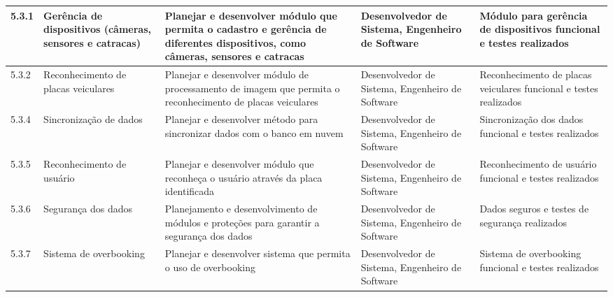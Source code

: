 \begin{longtable}{  l  p{}  p{}  p{}  p{}  }
	\midrule
	5.3.1       & Gerência de dispositivos (câmeras, sensores e catracas) & Planejar e desenvolver módulo que permita o cadastro e gerência de diferentes dispositivos, como câmeras, sensores e catracas                                                 & Desenvolvedor de Sistema, Engenheiro de Software                                                 & Módulo para gerência de dispositivos funcional e testes realizados                                     \\*
	\midrule
	5.3.2       & Reconhecimento de placas veiculares                       & Planejar e desenvolver módulo de processamento de imagem que permita o reconhecimento de placas veiculares                                                                      & Desenvolvedor de Sistema, Engenheiro de Software                                                 & Reconhecimento de placas veiculares funcional e testes realizados                                        \\*
	\midrule
	5.3.4       & Sincronização de dados                                  & Planejar e desenvolver método para sincronizar dados com o banco em nuvem                                                                                                       & Desenvolvedor de Sistema, Engenheiro de Software                                                 & Sincronização dos dados funcional e testes realizados                                                  \\*
	\midrule
	5.3.5       & Reconhecimento de usuário                                & Planejar e desenvolver módulo que reconheça o usuário através da placa identificada                                                                                          & Desenvolvedor de Sistema, Engenheiro de Software                                                 & Reconhecimento de usuário funcional e testes realizados                                                 \\*
	\midrule
	5.3.6       & Segurança dos dados                                      & Planejamento e desenvolvimento de módulos e proteções para garantir a segurança dos dados                                                                                    & Desenvolvedor de Sistema, Engenheiro de Software                                                 & Dados seguros e testes de segurança realizados                                                          \\*
	\midrule
	5.3.7       & Sistema de overbooking                                    & Planejar e desenvolver sistema que permita o uso de overbooking                                                                                                                  & Desenvolvedor de Sistema, Engenheiro de Software                                                 & Sistema de overbooking funcional e testes realizados                                                     \\*

\end{longtable}
